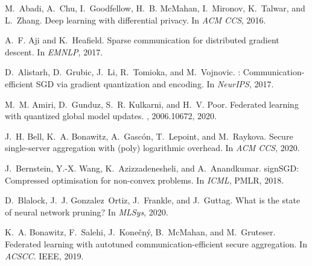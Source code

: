 \documentclass[11pt]{article}
\begin{document}




\begin{thebibliography}{10}
\setlength{\itemsep}{1pt}
\begin{small}
M.~Abadi, A.~Chu, I.~Goodfellow, H.~B. McMahan, I.~Mironov, K.~Talwar, and
  L.~Zhang.
\newblock Deep learning with differential privacy.
\newblock In {\em ACM CCS}, 2016.

A.~F. Aji and K.~Heafield.
\newblock Sparse communication for distributed gradient descent.
\newblock In {\em EMNLP}, 2017.

D.~Alistarh, D.~Grubic, J.~Li, R.~Tomioka, and M.~Vojnovic.
: {C}ommunication-efficient {SGD} via gradient quantization and
  encoding.
\newblock In {\em NeurIPS}, 2017.

M.~M. Amiri, D.~Gunduz, S.~R. Kulkarni, and H.~V. Poor.
\newblock Federated learning with quantized global model updates.
, 2006.10672, 2020.

J.~H. Bell, K.~A. Bonawitz, A.~Gasc{\'o}n, T.~Lepoint, and M.~Raykova.
\newblock Secure single-server aggregation with (poly) logarithmic overhead.
\newblock In {\em ACM CCS}, 2020.

J.~Bernstein, Y.-X. Wang, K.~Azizzadenesheli, and A.~Anandkumar.
\newblock sign{SGD}: {C}ompressed optimisation for non-convex problems.
\newblock In {\em ICML}, PMLR, 2018.

D.~Blalock, J.~J. Gonzalez~Ortiz, J.~Frankle, and J.~Guttag.
\newblock What is the state of neural network pruning?
\newblock In {\em MLSys}, 2020.

K.~A. Bonawitz, F.~Salehi, J.~Kone{\v{c}}n{\'y}, B.~McMahan, and M.~Gruteser.
\newblock Federated learning with autotuned communication-efficient secure
  aggregation.
\newblock In {\em ACSCC}. {IEEE}, 2019.


\end{small}
\end{thebibliography}
\end{document}
